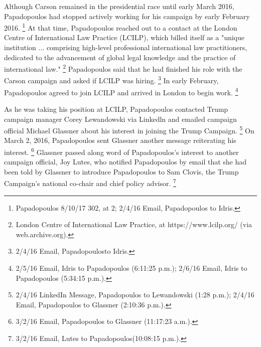 Although Carson remained in the presidential race until early March 2016, Papadopoulos had stopped actively working for his campaign by early February 2016.%
\footnote{Papadopoulos 8/10/17 302, at 2; 2/4/16 Email, Papadopoulos to Idris.}
At that time, Papadopoulos reached out to a contact at the London Centre of International Law Practice (LCILP), which billed itself as a "unique institution ... comprising high-level professional international law practitioners, dedicated to the advancement of global legal knowledge and the practice of international law."%
\footnote{London Centre of International Law Practice, at https://www.lcilp.org/ (via web.archive.org).}
Papadopoulos said that he had finished his role with the Carson campaign and asked if LCILP was hiring.%
\footnote{2/4/16 Email, Papadopoulosto Idris.}
In early February, Papadopoulos agreed to join LCILP and arrived in London to begin work.%
\footnote{2/5/16 Email, Idris to Papadopoulos (6:11:25 p.m.);
2/6/16 Email, Idris to Papadopoulos (5:34:15 p.m.).}

As he was taking his position at LCILP, Papadopoulos contacted Trump campaign manager Corey Lewandowski via Linkedln and emailed campaign official Michael Glassner about his interest in joining the Trump Campaign.%
\footnote{2/4/16 LinkedIn Message, Papadopoulos to Lewandowski (1:28 p.m.);
2/4/16 Email, Papadopoulos to Glassner (2:10:36 p.m.).}
On March 2, 2016, Papadopoulos sent Glassner another message reiterating his interest.%
\footnote{3/2/16 Email, Papadopoulos to Glassner (11:17:23 a.m.).}
Glassner passed along word of Papadopoulos's interest to another campaign official, Joy Lutes, who notified Papadopoulos by email that she had been told by Glassner to introduce Papadopoulos to Sam Clovis, the Trump Campaign's national co-chair and chief policy advisor.%
\footnote{3/2/16 Email, Lutes to Papadopoulos(10:08:15 p.m.).}


